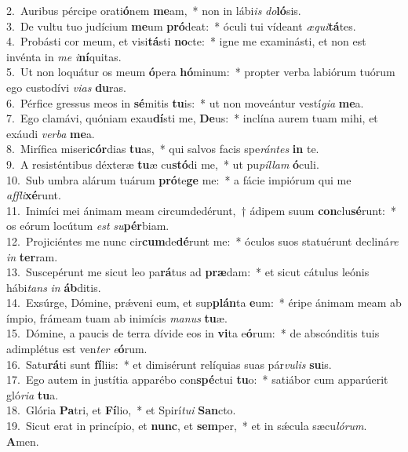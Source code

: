 {2.~}Auribus pércipe orati\textbf{ó}nem \textbf{me}am,~* non in lábi\textit{is} \textit{do}\textbf{ló}sis.\\
{3.~}De vultu tuo judícium \textbf{me}um \textbf{pró}deat:~* óculi tui vídeant \textit{æ}\textit{qui}\textbf{tá}tes.\\
{4.~}Probásti cor meum, et visi\textbf{tá}sti \textbf{no}cte:~* igne me examinásti, et non est invénta in \textit{me} \textit{i}\textbf{ní}quitas.\\
{5.~}Ut non loquátur os meum \textbf{ó}pera \textbf{hó}minum:~* propter verba labiórum tuórum ego custodívi \textit{vi}\textit{as} \textbf{du}ras.\\
{6.~}Pérfice gressus meos in \textbf{sé}mitis \textbf{tu}is:~* ut non moveántur vestí\textit{gi}\textit{a} \textbf{me}a.\\
{7.~}Ego clamávi, quóniam exau\textbf{dí}sti me, \textbf{De}us:~* inclína aurem tuam mihi, et exáudi \textit{ver}\textit{ba} \textbf{me}a.\\
{8.~}Mirífica miseri\textbf{cór}dias \textbf{tu}as,~* qui salvos facis spe\textit{rán}\textit{tes} \textbf{in} te.\\
{9.~}A resisténtibus déxteræ \textbf{tu}æ cu\textbf{stó}di me,~* ut pu\textit{píl}\textit{lam} \textbf{ó}culi.\\
{10.~}Sub umbra alárum tuárum \textbf{pró}te\textbf{ge} me:~* a fácie impiórum qui me \textit{af}\textit{fli}\textbf{xé}runt.\\
{11.~}Inimíci mei ánimam meam circumdedérunt,~† ádipem suum \textbf{con}clu\textbf{sé}runt:~* os eórum locútum \textit{est} \textit{su}\textbf{pér}biam.\\
{12.~}Projiciéntes me nunc cir\textbf{cum}de\textbf{dé}runt me:~* óculos suos statuérunt decliná\textit{re} \textit{in} \textbf{ter}ram.\\
{13.~}Suscepérunt me sicut leo pa\textbf{rá}tus ad \textbf{præ}dam:~* et sicut cátulus leónis hábi\textit{tans} \textit{in} \textbf{áb}ditis.\\
{14.~}Exsúrge, Dómine, prǽveni eum, et sup\textbf{plán}ta \textbf{e}um:~* éripe ánimam meam ab ímpio, frámeam tuam ab inimícis \textit{ma}\textit{nus} \textbf{tu}æ.\\
{15.~}Dómine, a paucis de terra dívide eos in \textbf{vi}ta e\textbf{ó}rum:~* de abscónditis tuis adimplétus est ven\textit{ter} \textit{e}\textbf{ó}rum.\\
{16.~}Satu\textbf{rá}ti sunt \textbf{fí}liis:~* et dimisérunt relíquias suas pár\textit{vu}\textit{lis} \textbf{su}is.\\
{17.~}Ego autem in justítia apparébo con\textbf{spé}ctui \textbf{tu}o:~* satiábor cum apparúerit gló\textit{ri}\textit{a} \textbf{tu}a.\\
{18.~}Glória \textbf{Pa}tri, et \textbf{Fí}lio,~* et Spirí\textit{tu}\textit{i} \textbf{San}cto.\\
{19.~}Sicut erat in princípio, et \textbf{nunc}, et \textbf{sem}per,~* et in sǽcula sæcu\textit{ló}\textit{rum}. \textbf{A}men.\\
